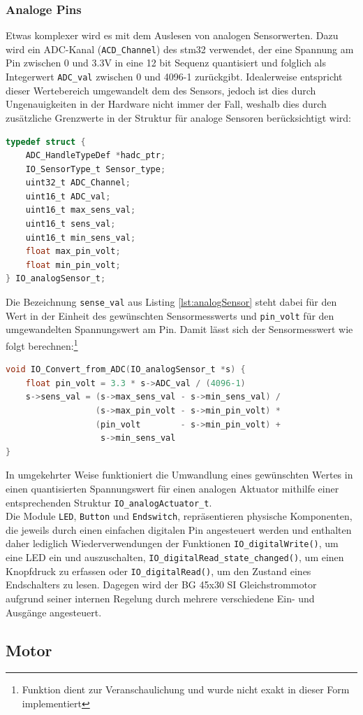 \subsubsection{Analoge Pins}
Etwas komplexer wird es mit dem Auslesen von analogen Sensorwerten. Dazu wird ein ADC-Kanal (\verb|ACD_Channel|) des stm32 verwendet, der eine Spannung am Pin zwischen 0 und 3.3V in eine 12 bit Sequenz quantisiert und folglich als Integerwert \verb|ADC_val| zwischen 0 und 4096-1 zurückgibt. Idealerweise entspricht dieser Wertebereich umgewandelt dem des Sensors, jedoch ist dies durch Ungenauigkeiten in der Hardware nicht immer der Fall, weshalb dies durch zusätzliche Grenzwerte in der Struktur für analoge Sensoren berücksichtigt wird:
\begin{lstlisting}[language=C, caption={Struktur für analoge Sensoren}, label={lst:analogSensor}]
typedef struct {
	ADC_HandleTypeDef *hadc_ptr;
	IO_SensorType_t Sensor_type;
	uint32_t ADC_Channel;
	uint16_t ADC_val;
	uint16_t max_sens_val;
	uint16_t sens_val;
	uint16_t min_sens_val;
	float max_pin_volt;
	float min_pin_volt;
} IO_analogSensor_t;
\end{lstlisting}
Die Bezeichnung \verb|sense_val| aus Listing \ref{lst:analogSensor} steht dabei für den Wert in der Einheit des gewünschten Sensormesswerts und \verb|pin_volt| für den umgewandelten Spannungswert am Pin. Damit lässt sich der Sensormesswert wie folgt berechnen:\footnote{Funktion dient zur Veranschaulichung und wurde nicht exakt in dieser Form implementiert}
\begin{lstlisting}[language=C, caption={Konvertierung des rohen Analogwerts}, label={analogRead}]
void IO_Convert_from_ADC(IO_analogSensor_t *s) {
	float pin_volt = 3.3 * s->ADC_val / (4096-1)
	s->sens_val = (s->max_sens_val - s->min_sens_val) /
	              (s->max_pin_volt - s->min_pin_volt) *
	              (pin_volt        - s->min_pin_volt) +
	               s->min_sens_val
}
\end{lstlisting}
In umgekehrter Weise funktioniert die Umwandlung eines gewünschten Wertes in einen quantisierten Spannungswert für einen analogen Aktuator mithilfe einer entsprechenden Struktur \verb|IO_analogActuator_t|. \\
Die Module \verb|LED|, \verb|Button| und \verb|Endswitch|, repräsentieren physische Komponenten, die jeweils durch einen einfachen digitalen Pin angesteuert werden und enthalten daher lediglich Wiederverwendungen der Funktionen \verb|IO_digitalWrite()|, um eine LED ein und auszuschalten, \verb|IO_digitalRead_state_changed()|, um einen Knopfdruck zu erfassen oder \verb|IO_digitalRead()|, um den Zustand eines Endschalters zu lesen. Dagegen wird der BG 45x30 SI Gleichstrommotor aufgrund seiner internen Regelung durch mehrere verschiedene Ein- und Ausgänge angesteuert.
\subsection{Motor}




